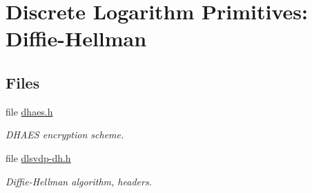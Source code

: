 \hypertarget{group__DL__dh__m}{
\section{Discrete Logarithm Primitives: Diffie-Hellman}
\label{group__DL__dh__m}
}
\subsection*{Files}
\begin{CompactItemize}
\item 
file \hyperlink{dhaes_8h}{dhaes.h}
\begin{CompactList}\small\item\em DHAES encryption scheme. \item\end{CompactList}

\item 
file \hyperlink{dlsvdp-dh_8h}{dlsvdp-dh.h}
\begin{CompactList}\small\item\em Diffie-Hellman algorithm, headers. \item\end{CompactList}

\end{CompactItemize}
